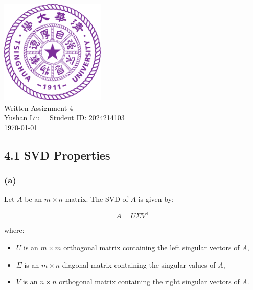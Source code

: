 \documentclass[12pt]{article}
\begin{document}
\begin{titlepage}
    \begin{center}
        \includegraphics[width=5cm]{tsinghua_logo.png}\\[4cm]  %
        {\Huge Written Assignment 4} \\[2cm]
        {\large Yushan Liu  \ \  Student ID: 2024214103}\\[6cm]
        {\normalsize \today}\\[1cm]

        \vfill
        
    \end{center}
\end{titlepage}


\subsection*{4.1 SVD Properties}

\subsubsection*{(a)}

Let \( A \) be an \( m \times n \) matrix. The SVD of \( A \) is given by:

\[
A = U \Sigma V^\top
\]

where:
\begin{itemize}
    \item \( U \) is an \( m \times m \) orthogonal matrix containing the left singular vectors of \( A \),
    \item \( \Sigma \) is an \( m \times n \) diagonal matrix containing the singular values of \( A \),
    \item \( V \) is an \( n \times n \) orthogonal matrix containing the right singular vectors of \( A \).
\end{itemize}
\end{document}
